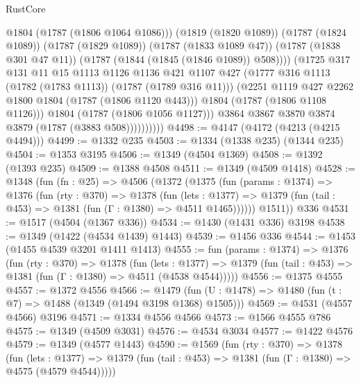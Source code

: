 \begin{lexlean}{RustCore}
\begin{coremodule}
                            @1804
                            (@1787 (@1806 @1064 @1086)))
                          (@1819 (@1820 @1089))
                          (@1787 (@1824 @1089))
                          (@1787 (@1829 @1089))
                          (@1787 (@1833 @1089 @47))
                          (@1787 (@1838 @301 @47 @11))
                          (@1787 (@1844 (@1845 (@1846 @1089)) @508))))
                      (@1725
                        @317
                        @131
                        @11
                        @15
                        @1113
                        @1126
                        @1136
                        @421
                        @1107
                        @427
                        (@1777 @316 @1113 (@1782 (@1783 @1113)) (@1787 (@1789 @316 @11)))
                        (@2251 @1119 @427 @2262 @1800 @1804 (@1787 (@1806 @1120 @443)))
                        @1804
                        (@1787 (@1806 @1108 @1126)))
                      @1804
                      (@1787 (@1806 @1056 @1127)))
                    @3864
                    @3867
                    @3870
                    @3874
                    @3879
                    (@1787 (@3883 @508))))))))))
@4498 := @4147 (@4172 (@4213 (@4215 @4494)))
@4499 := @1332 @235
@4503 := @1334 (@1338 @235) (@1344 @235)
@4504 := @1353 @3195
@4506 := @1349 (@4504 @1369)
@4508 := @1392 (@1393 @235)
@4509 := @1388 @4508
@4511 := @1349 (@4509 @1418)
@4528 := @1348
    (fun (fn : @25) =>
    @4506
      (@1372
        (@1375
          (fun (params : @1374) =>
          @1376
            (fun (rty : @370) =>
            @1378
              (fun (lets : @1377) =>
              @1379 (fun (tail : @453) => @1381 (fun (Γ : @1380) => @4511 @1465))))))
        @1511))
    @336
@4531 := @1517 (@4504 (@1367 @336))
@4534 := @1430 (@1431 @336) @3198
@4538 := @1349 (@1422 (@4534 @1439) @1443)
@4539 := @1456 @336
@4544 := @1453 (@1455 @4539 @3201 @1411 @1413)
@4555 := fun (params : @1374) =>
  @1376
    (fun (rty : @370) =>
    @1378
      (fun (lets : @1377) =>
      @1379 (fun (tail : @453) => @1381 (fun (Γ : @1380) => @4511 (@4538 @4544)))))
@4556 := @1375 @4555
@4557 := @1372 @4556
@4566 := @1479 (fun (U : @1478) => @1480 (fun (t : @7) => @1488 (@1349 (@1494 @3198 @1368) @1505)))
@4569 := @4531 (@4557 @4566) @3196
@4571 := @1334 @4556 @4566
@4573 := @1566 @4555 @786
@4575 := @1349 (@4509 @3031)
@4576 := @4534 @3034
@4577 := @1422 @4576
@4579 := @1349 (@4577 @1443)
@4590 := @1569
    (fun (rty : @370) =>
    @1378
      (fun (lets : @1377) =>
      @1379 (fun (tail : @453) => @1381 (fun (Γ : @1380) => @4575 (@4579 @4544)))))

\end{coremodule}
\end{lexlean}
